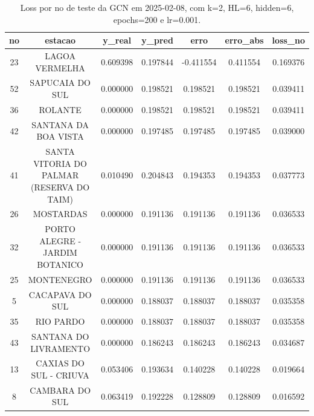 \begin{table}[h]
\centering
\caption{Loss por no de teste da GCN em 2025-02-08, com k=2, HL=6, hidden=6, epochs=200 e lr=0.001.}
\label{tab:gcn_loss_k2_hl6_h6_e200_d20250208}
\begin{tabular}{ccccccc}
\toprule
no & estacao & y\_real & y\_pred & erro & erro\_abs & loss\_no \\
\midrule
23 & LAGOA VERMELHA & 0.609398 & 0.197844 & -0.411554 & 0.411554 & 0.169376 \\
52 & SAPUCAIA DO SUL & 0.000000 & 0.198521 & 0.198521 & 0.198521 & 0.039411 \\
36 & ROLANTE & 0.000000 & 0.198521 & 0.198521 & 0.198521 & 0.039411 \\
42 & SANTANA DA BOA VISTA & 0.000000 & 0.197485 & 0.197485 & 0.197485 & 0.039000 \\
41 & SANTA VITORIA DO PALMAR (RESERVA DO TAIM) & 0.010490 & 0.204843 & 0.194353 & 0.194353 & 0.037773 \\
26 & MOSTARDAS & 0.000000 & 0.191136 & 0.191136 & 0.191136 & 0.036533 \\
32 & PORTO ALEGRE - JARDIM BOTANICO & 0.000000 & 0.191136 & 0.191136 & 0.191136 & 0.036533 \\
25 & MONTENEGRO & 0.000000 & 0.191136 & 0.191136 & 0.191136 & 0.036533 \\
5 & CACAPAVA DO SUL & 0.000000 & 0.188037 & 0.188037 & 0.188037 & 0.035358 \\
35 & RIO PARDO & 0.000000 & 0.188037 & 0.188037 & 0.188037 & 0.035358 \\
43 & SANTANA DO LIVRAMENTO & 0.000000 & 0.186243 & 0.186243 & 0.186243 & 0.034687 \\
13 & CAXIAS DO SUL - CRIUVA & 0.053406 & 0.193634 & 0.140228 & 0.140228 & 0.019664 \\
8 & CAMBARA DO SUL & 0.063419 & 0.192228 & 0.128809 & 0.128809 & 0.016592 \\
\bottomrule
\end{tabular}
\end{table}

